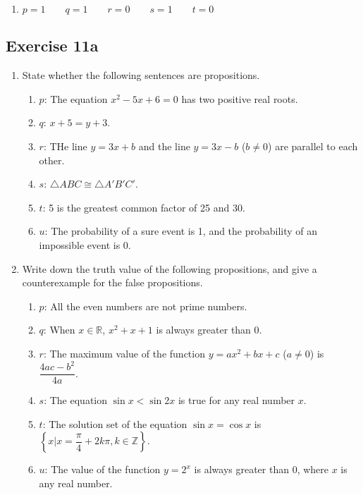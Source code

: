 \documentclass{report}
\newcounter{example}
\begin{document}
\begin{solution}
    \item \begin{enumerate}[label=]
        \item $p = 1 \qquad q = 1 \qquad r = 0 \qquad s = 1 \qquad t = 0$
    \end{enumerate}
\end{solution}

\subsection*{Exercise 11a}
\begin{enumerate}[leftmargin=*]
    \item State whether the following sentences are propositions.
          \begin{enumerate}[label=, leftmargin=*]
              \item $p$: The equation $x^2 - 5x + 6 = 0$ has two positive real roots.
              \item $q$: $x + 5 = y + 3$.
              \item $r$: THe line $y = 3x + b$ and the line $y = 3x - b$ ($b \neq 0$) are parallel to each other.
              \item $s$: $\triangle ABC \cong \triangle A'B'C'$.
              \item $t$: 5 is the greatest common factor of 25 and 30.
              \item $u$: The probability of a sure event is 1, and the probability of an impossible event is 0.
          \end{enumerate}
    \item Write down the truth value of the following propositions, and give a
          counterexample for the false propositions.
          \begin{enumerate}[label=, leftmargin=*]
              \item $p$: All the even numbers are not prime numbers.
              \item $q$: When $x \in \mathbb{R}$, $x^2 + x + 1$ is always greater than 0.
              \item $r$: The maximum value of the function $y = ax^2 + bx + c$ ($a \neq 0$) is $\dfrac{4ac - b^2}{4a}$.
              \item $s$: The equation $\sin x < \sin 2x$ is true for any real number $x$.
              \item $t$: The solution set of the equation $\sin x = \cos x$ is $\left\{x | x = \dfrac{\pi}{4} + 2k\pi, k \in \mathbb{Z}\right\}$.
              \item $u$: The value of the function $y = 2^x$ is always greater than 0, where $x$ is any real number.
          \end{enumerate}
\end{enumerate}
\end{document}
